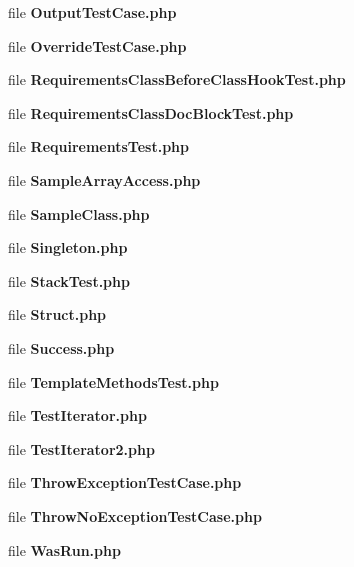 \begin{DoxyCompactItemize}
file {\bf Output\+Test\+Case.\+php}
\item 
file {\bf Override\+Test\+Case.\+php}
\item 
file {\bf Requirements\+Class\+Before\+Class\+Hook\+Test.\+php}
\item 
file {\bf Requirements\+Class\+Doc\+Block\+Test.\+php}
\item 
file {\bf Requirements\+Test.\+php}
\item 
file {\bf Sample\+Array\+Access.\+php}
\item 
file {\bf Sample\+Class.\+php}
\item 
file {\bf Singleton.\+php}
\item 
file {\bf Stack\+Test.\+php}
\item 
file {\bf Struct.\+php}
\item 
file {\bf Success.\+php}
\item 
file {\bf Template\+Methods\+Test.\+php}
\item 
file {\bf Test\+Iterator.\+php}
\item 
file {\bf Test\+Iterator2.\+php}
\item 
file {\bf Throw\+Exception\+Test\+Case.\+php}
\item 
file {\bf Throw\+No\+Exception\+Test\+Case.\+php}
\item 
file {\bf Was\+Run.\+php}
\end{DoxyCompactItemize}
